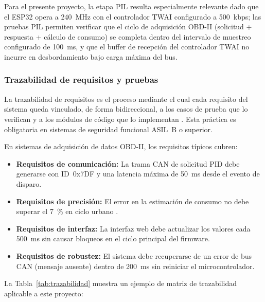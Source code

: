 \noindent Para el presente proyecto, la etapa PIL resulta
especialmente relevante dado que el ESP32 opera a 240~MHz con
el controlador TWAI configurado a 500~kbps; las pruebas PIL
permiten verificar que el ciclo de adquisición OBD-II
(solicitud + respuesta + cálculo de consumo) se completa
dentro del intervalo de muestreo configurado de 100~ms, y que
el buffer de recepción del controlador TWAI no incurre en
desbordamiento bajo carga máxima del bus.

\subsubsection{Trazabilidad de requisitos y pruebas}

La trazabilidad de requisitos es el proceso mediante el cual
cada requisito del sistema queda vinculado, de forma
bidireccional, a los casos de prueba que lo verifican y a los
módulos de código que lo implementan \citep{ISO26262_2018}.
Esta práctica es obligatoria en sistemas de seguridad
funcional ASIL~B o superior.

En sistemas de adquisición de datos OBD-II, los requisitos
típicos cubren:

\begin{itemize}
	\item \textbf{Requisitos de comunicación:} La trama CAN de
	solicitud PID debe generarse con ID~0x7DF y una
	latencia máxima de 50~ms desde el evento de disparo.
	\item \textbf{Requisitos de precisión:} El error en la
	estimación de consumo no debe superar el 7~\% en
	ciclo urbano \citep{Rimpas2020}.
	\item \textbf{Requisitos de interfaz:} La interfaz web
	debe actualizar los valores cada 500~ms sin causar
	bloqueos en el ciclo principal del firmware.
	\item \textbf{Requisitos de robustez:} El sistema debe
	recuperarse de un error de bus CAN (mensaje ausente)
	dentro de 200~ms sin reiniciar el microcontrolador.
\end{itemize}

La Tabla~\ref{tab:trazabilidad} muestra un ejemplo de matriz
de trazabilidad aplicable a este proyecto:


